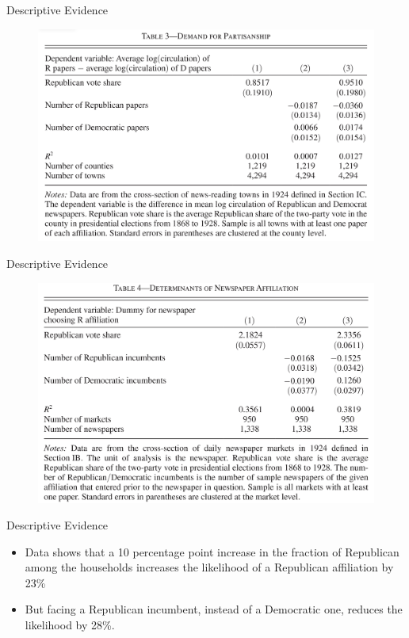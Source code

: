 \documentclass{beamer}
\begin{document}
\begin{frame}[t]{Descriptive Evidence}
  \begin{figure}
  \begin{center}
    \includegraphics[scale=0.15]{Table3.png}
  \end{center}
  \end{figure}
\end{frame}


\begin{frame}[t]{Descriptive Evidence}
  \begin{figure}
  \begin{center}
    \includegraphics[scale=0.15]{Table4.png}
  \end{center}
  \end{figure}
\end{frame}

\begin{frame}[t]{Descriptive Evidence}
  \begin{itemize}
    \item Data shows that a 10 percentage point increase in the fraction of
      Republican among the households increases the likelihood of a Republican
      affiliation by 23\%
    \item But facing a Republican incumbent, instead of a Democratic one,
      reduces the likelihood by 28\%.
  \end{itemize}
\end{frame}
\end{document}
